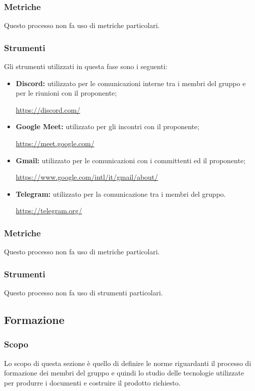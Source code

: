 \subsubsection{Metriche}
Questo processo non fa uso di metriche particolari.
\subsubsection{Strumenti}
Gli strumenti utilizzati in questa fase sono i seguenti:
\begin{itemize}
  \item \textbf{Discord:} utilizzato per le comunicazioni interne tra i membri del gruppo e per le riunioni con il proponente;
  \begin{center}
    \url{https://discord.com/}
  \end{center}  
  \item \textbf{Google Meet:} utilizzato per gli incontri con il proponente;
  \begin{center}
    \url{https://meet.google.com/}
  \end{center} 
  \item \textbf{Gmail:} utilizzato per le comunicazioni con i committenti ed il proponente;
  \begin{center}
    \url{https://www.google.com/intl/it/gmail/about/}
  \end{center} 
  \item \textbf{Telegram:} utilizzato per la comunicazione tra i membri del gruppo.
  \begin{center}
    \url{https://telegram.org/}
  \end{center} 
\end{itemize} 
\vspace{2cm}
\subsubsection{Metriche}
Questo processo non fa uso di metriche particolari.
\subsubsection{Strumenti}
Questo processo non fa uso di strumenti particolari.

\subsection{Formazione} \label{subsection: formazione}
\subsubsection {Scopo}
Lo scopo di questa sezione è quello di definire le norme riguardanti il processo di formazione dei membri del gruppo \groupName{} e quindi lo studio delle tecnologie utilizzate per produrre i documenti e costruire il prodotto richiesto.
